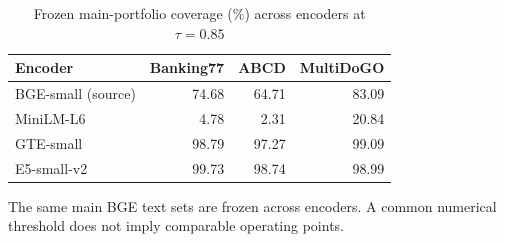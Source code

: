 \begin{table}[!htb]
\caption{Frozen main-portfolio coverage (\%) across encoders at $\tau=0.85$}
\label{tab:cross-encoder-coverage}
\centering\footnotesize
\setlength{\tabcolsep}{3pt}
\renewcommand{\arraystretch}{1.12}
\begin{tabular*}{\columnwidth}{@{\extracolsep{\fill}}lrrr@{}}
\toprule
Encoder & Banking77 & ABCD & MultiDoGO \\
\midrule
BGE-small (source) & 74.68 & 64.71 & 83.09 \\
MiniLM-L6 & 4.78 & 2.31 & 20.84 \\
GTE-small & 98.79 & 97.27 & 99.09 \\
E5-small-v2 & 99.73 & 98.74 & 98.99 \\
\bottomrule
\end{tabular*}
\par\vspace{2pt}
\begin{minipage}{\columnwidth}\footnotesize
The same main BGE text sets are frozen across encoders. A common numerical threshold does not imply comparable operating points.
\end{minipage}
\end{table}
